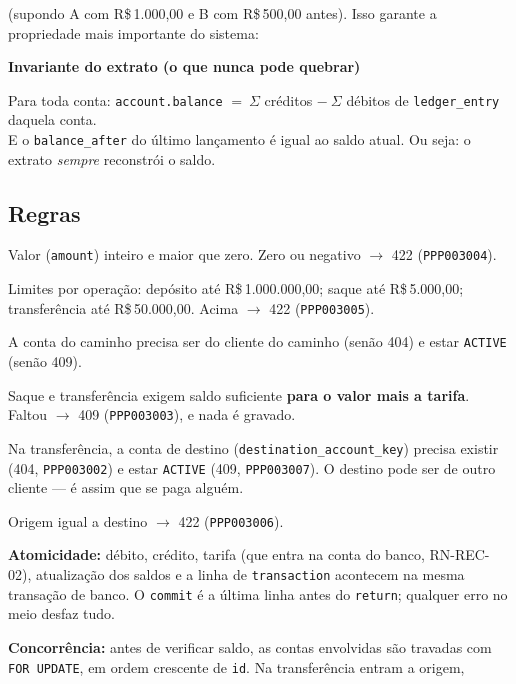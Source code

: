 \documentclass[11pt,a4paper]{article}
\newcommand{\obr}{\textbf{[OBR]}}          %
\newcommand{\dec}{\textbf{[DEC]}}          %
\newcommand{\rs}{R\$\,}
\newcommand{\tb}[1]{\texttt{#1}}           %
\newenvironment{aviso}[1]{%
  \par\medskip\noindent\tabularx{\linewidth}{|X|}\hline
  \textbf{#1}\par\smallskip}{%
  \\\hline\endtabularx\par\medskip}
\begin{document}
(supondo A com \rs 1.000,00 e B com \rs 500,00 antes). Isso garante a propriedade mais
importante do sistema:

\begin{aviso}{Invariante do extrato (o que nunca pode quebrar)}
Para toda conta: \quad \tb{account.balance} $=\ \Sigma$ créditos $-\ \Sigma$ débitos de
\tb{ledger_entry} daquela conta.\\
E o \tb{balance_after} do último lançamento é igual ao saldo atual. Ou seja: o extrato
\emph{sempre} reconstrói o saldo.
\end{aviso}

\subsection{Regras}

\begin{regras}
  \item[RN-MOV-01 \obr] Valor (\tb{amount}) inteiro e maior que zero. Zero ou negativo $\to$ 422
  (\tb{PPP003004}).
  \item[RN-MOV-02 \dec] Limites por operação: depósito até \rs 1.000.000,00; saque até
  \rs 5.000,00; transferência até \rs 50.000,00. Acima $\to$ 422 (\tb{PPP003005}).
  \item[RN-MOV-03 \obr] A conta do caminho precisa ser do cliente do caminho (senão 404) e estar
  \tb{ACTIVE} (senão 409).
  \item[RN-MOV-04 \obr] Saque e transferência exigem saldo suficiente \textbf{para o valor mais a
  tarifa}. Faltou $\to$ 409 (\tb{PPP003003}), e nada é gravado.
  \item[RN-MOV-05 \obr] Na transferência, a conta de destino (\tb{destination_account_key}) precisa
  existir (404, \tb{PPP003002}) e estar \tb{ACTIVE} (409, \tb{PPP003007}). O destino pode ser de
  outro cliente --- é assim que se paga alguém.
  \item[RN-MOV-06 \obr] Origem igual a destino $\to$ 422 (\tb{PPP003006}).
  \item[RN-MOV-07 \obr] \textbf{Atomicidade:} débito, crédito, tarifa (que entra na conta do
  banco, RN-REC-02), atualização dos saldos e a linha de \tb{transaction} acontecem na mesma
  transação de banco. O \tb{commit} é a última linha antes do \tb{return}; qualquer erro no meio
  desfaz tudo.
  \item[RN-MOV-08 \obr] \textbf{Concorrência:} antes de verificar saldo, as contas envolvidas são
  travadas com \tb{FOR UPDATE}, em ordem crescente de \tb{id}. Na transferência entram a origem,

\end{regras}
\end{document}
